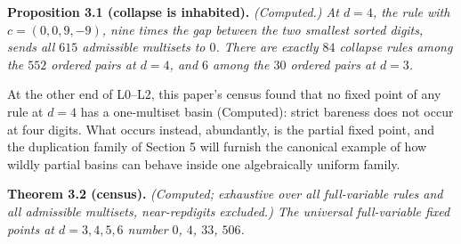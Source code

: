 \documentclass[11pt,letterpaper]{article}
\theoremstyle{paperstyle}
\theoremstyle{paperstyledef}
\theoremstyle{paperstylerem}
\begin{document}
\textbf{Proposition 3.1 (collapse is inhabited).} \emph{(Computed.) At \(d = 4\), the rule with \(c = (0,0,9,-9)\), nine times the gap between the two smallest sorted digits, sends all \(615\) admissible multisets to \(0\). There are exactly \(84\) collapse rules among the \(552\) ordered pairs at \(d = 4\), and \(6\) among the \(30\) ordered pairs at \(d = 3\).}

At the other end of L0--L2, this paper's census found that no fixed point of any rule at \(d=4\) has a one-multiset basin (Computed): strict bareness does not occur at four digits. What occurs instead, abundantly, is the partial fixed point, and the duplication family of Section 5 will furnish the canonical example of how wildly partial basins can behave inside one algebraically uniform family.

\textbf{Theorem 3.2 (census).} \emph{(Computed; exhaustive over all full-variable rules and all admissible multisets, near-repdigits excluded.) The universal full-variable fixed points at \(d = 3, 4, 5, 6\) number \(0\), \(4\), \(33\), \(506\).}
\end{document}
